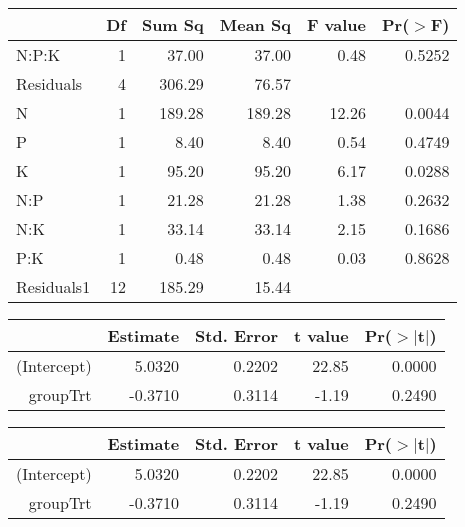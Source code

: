 \begin{table}[ht]
\begin{center}
\begin{tabular}{lrrrrr}
  \hline
 & Df & Sum Sq & Mean Sq & F value & Pr($>$F) \\ 
  \hline
N:P:K     & 1 & 37.00 & 37.00 & 0.48 & 0.5252 \\ 
  Residuals & 4 & 306.29 & 76.57 &  &  \\ 
  N         & 1 & 189.28 & 189.28 & 12.26 & 0.0044 \\ 
  P         & 1 & 8.40 & 8.40 & 0.54 & 0.4749 \\ 
  K         & 1 & 95.20 & 95.20 & 6.17 & 0.0288 \\ 
  N:P       & 1 & 21.28 & 21.28 & 1.38 & 0.2632 \\ 
  N:K       & 1 & 33.14 & 33.14 & 2.15 & 0.1686 \\ 
  P:K       & 1 & 0.48 & 0.48 & 0.03 & 0.8628 \\ 
  Residuals1 & 12 & 185.29 & 15.44 &  &  \\ 
   \hline
\end{tabular}
\end{center}
\end{table}
\clearpage
\begin{table}[ht]
\begin{tabular}{rrrrr}
  \hline
 & Estimate & Std. Error & t value & Pr($>$$|$t$|$) \\ 
  \hline
(Intercept) & 5.0320 & 0.2202 & 22.85 & 0.0000 \\ 
  groupTrt & -0.3710 & 0.3114 & -1.19 & 0.2490 \\ 
   \hline
\end{tabular}
\end{table}
\begin{table}[ht]
\begin{tabular}{rrrrr}
  \hline
 & Estimate & Std. Error & t value & Pr($>$$|$t$|$) \\ 
  \hline
(Intercept) & 5.0320 & 0.2202 & 22.85 & 0.0000 \\ 
  groupTrt & -0.3710 & 0.3114 & -1.19 & 0.2490 \\ 
   \hline
\end{tabular}
\end{table}
